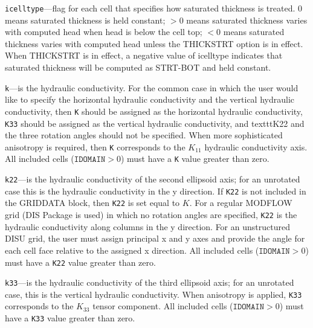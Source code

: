 \begin{description}
\item \texttt{icelltype}---flag for each cell that specifies how saturated thickness is treated.  0 means saturated thickness is held constant;  $>$0 means saturated thickness varies with computed head when head is below the cell top; $<$0 means saturated thickness varies with computed head unless the THICKSTRT option is in effect.  When THICKSTRT is in effect, a negative value of icelltype indicates that saturated thickness will be computed as STRT-BOT and held constant.

\item \texttt{k}---is the hydraulic conductivity.  For the common case in which the user would like to specify the horizontal hydraulic conductivity and the vertical hydraulic conductivity, then \texttt{K} should be assigned as the horizontal hydraulic conductivity, \texttt{K33} should be assigned as the vertical hydraulic conductivity, and texttt{K22} and the three rotation angles should not be specified.  When more sophisticated anisotropy is required, then \texttt{K} corresponds to the $K_{11}$ hydraulic conductivity axis.  All included cells ($\texttt{IDOMAIN} > 0$) must have a \texttt{K} value greater than zero.

\item \texttt{k22}---is the hydraulic conductivity of the second ellipsoid axis; for an unrotated case this is the hydraulic conductivity in the y direction.  If \texttt{K22} is not included in the GRIDDATA block, then \texttt{K22} is set equal to $K$.  For a regular MODFLOW grid (DIS Package is used) in which no rotation angles are specified, \texttt{K22} is the hydraulic conductivity along columns in the y direction. For an unstructured DISU grid, the user must assign principal x and y axes and provide the angle for each cell face relative to the assigned x direction.  All included cells ($\texttt{IDOMAIN} > 0$) must have a \texttt{K22} value greater than zero.

\item \texttt{k33}---is the hydraulic conductivity of the third ellipsoid axis; for an unrotated case, this is the vertical hydraulic conductivity.  When anisotropy is applied, \texttt{K33} corresponds to the $K_{33}$ tensor component.  All included cells ($\texttt{IDOMAIN} > 0$) must have a \texttt{K33} value greater than zero.


\end{description}

